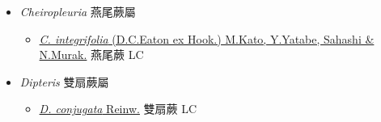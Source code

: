 
  \begin{itemize}
 \item[] \textit{Cheiropleuria} 燕尾蕨屬
                    
  \begin{itemize}
        \item[] \href{http://www.theplantlist.org/tpl1.1/search?q=Cheiropleuria+integrifolia}{\textit{C. integrifolia} (D.C.Eaton ex Hook.) M.Kato, Y.Yatabe, Sahashi \& N.Murak.}     燕尾蕨 LC
  \end{itemize}
 \item[] \textit{Dipteris} 雙扇蕨屬
                    
  \begin{itemize}
        \item[] \href{http://www.theplantlist.org/tpl1.1/search?q=Dipteris+conjugata}{\textit{D. conjugata} Reinw.}   雙扇蕨 LC
  \end{itemize}
  \end{itemize}
